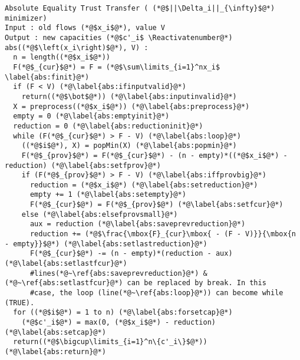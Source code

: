 \Suppressnumber
\begin{lstlisting}[label=abs, style=numbers]
Absolute Equality Trust Transfer ( (*@$||\Delta_i||_{\infty}$@*) minimizer)
Input : old flows (*@$x_i$@*), value V
Output : new capacities (*@$c'_i$ \Reactivatenumber@*)
abs((*@$\left(x_i\right)$@*), V) :
  n = length((*@$x_i$@*))
  F(*@$_{cur}$@*) = F = (*@$\sum\limits_{i=1}^nx_i$ \label{abs:finit}@*)
  if (F < V) (*@\label{abs:ifinputvalid}@*)
    return((*@$\bot$@*)) (*@\label{abs:inputinvalid}@*)
  X = preprocess((*@$x_i$@*)) (*@\label{abs:preprocess}@*)
  empty = 0 (*@\label{abs:emptyinit}@*)
  reduction = 0 (*@\label{abs:reductioninit}@*)
  while (F(*@$_{cur}$@*) > F - V) (*@\label{abs:loop}@*)
    ((*@$i$@*), X) = popMin(X) (*@\label{abs:popmin}@*)
    F(*@$_{prov}$@*) = F(*@$_{cur}$@*) - (n - empty)*((*@$x_i$@*) - reduction) (*@\label{abs:setfprov}@*)
    if (F(*@$_{prov}$@*) > F - V) (*@\label{abs:iffprovbig}@*)
      reduction = (*@$x_i$@*) (*@\label{abs:setreduction}@*)
      empty += 1 (*@\label{abs:setempty}@*)
      F(*@$_{cur}$@*) = F(*@$_{prov}$@*) (*@\label{abs:setfcur}@*)
    else (*@\label{abs:elsefprovsmall}@*)
      aux = reduction (*@\label{abs:saveprevreduction}@*)
      reduction += (*@$\frac{\mbox{F}_{cur}\mbox{ - (F - V)}}{\mbox{n - empty}}$@*) (*@\label{abs:setlastreduction}@*)
      F(*@$_{cur}$@*) -= (n - empty)*(reduction - aux) (*@\label{abs:setlastfcur}@*)
      #lines(*@~\ref{abs:saveprevreduction}@*) &(*@~\ref{abs:setlastfcur}@*) can be replaced by break. In this
      #case, the loop (line(*@~\ref{abs:loop}@*)) can become while (TRUE).
  for ((*@$i$@*) = 1 to n) (*@\label{abs:forsetcap}@*)
    (*@$c'_i$@*) = max(0, (*@$x_i$@*) - reduction) (*@\label{abs:setcap}@*)
  return((*@$\bigcup\limits_{i=1}^n\{c'_i\}$@*)) (*@\label{abs:return}@*)
\end{lstlisting}
